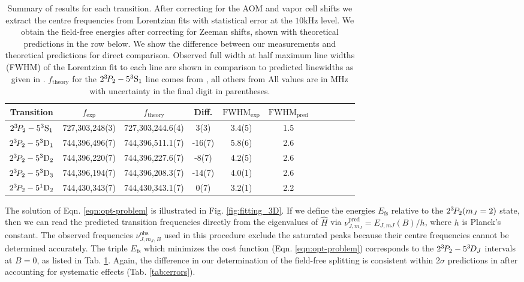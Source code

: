 \begin{table}
    \begin{tabular}{c c c c c c c c c c c}
      \hline\hline
      Transition                        &  $f_\textrm{exp}$ &  $f_\textrm{theory}$ & Diff.
		  &  $\textrm{FWHM}_{\textrm{exp}}$  &  $\textrm{FWHM}_{{\textrm{pred}}}$ \\
      \hline
        $2^{3\!} P_2 - 5^3\mathrm{S}_1$ &  {727,303,248(3)} &   727,303,244.6(4)   &  {3(3)}      &  3.4(5)  &  1.5\\ %
        $2^{3\!} P_2 - 5^3\mathrm{D}_1$ &  {744,396,496(7)} &   744,396,511.1(7)   &  {-16(7)}     &  5.8(6)  &  2.6\\
        $2^{3\!} P_2 - 5^3\mathrm{D}_2$ &  {744,396,220(7)} &   744,396,227.6(7)   &  {-8(7)}      &  4.2(5)  &  2.6\\
        $2^{3\!} P_2 - 5^3\mathrm{D}_3$ &  {744,396,194(7)} &   744,396,208.3(7)   &  {-14(7)}     &  4.0(1)  &  2.6\\
        $2^{3\!} P_2 - 5^1\mathrm{D}_2$ &  {744,430,343(7)} &   744,430,343.1(7)   &  {0(7)}      &  3.2(1)  &  2.2\\  %
      \hline\hline
    \end{tabular}
\caption{Summary of results for each transition.
	After correcting for the AOM and vapor cell shifts we extract the centre frequencies from Lorentzian fits with statistical error at the $10\textrm{kHz}$ level.
	We obtain the field-free energies after correcting for Zeeman shifts, shown with theoretical predictions in the row below.
	We show the difference between our measurements and theoretical predictions for direct comparison.
	Observed full width at half maximum line widths (FWHM) of the Lorentzian fit to each line are shown in comparison to predicted linewidths as given in \cite{Drake07}.
	$f_\textrm{theory}$ for the $2^{3\!} P_2 - 5^3\mathrm{S}_1$ line comes from \cite{Drake07}, all others from \cite{Yerokhin20}
	All values are in MHz with uncertainty in the final digit in parentheses.}
  \label{tab:results}
\end{table}
The solution of Eqn.
	\ref{eqn:opt-problem} is illustrated in Fig.
	\ref{fig:fitting_3D}.
	If we define the energies $E_{\textrm{fs}}$ relative to the $2^{3\!} P_2(m_J=2)$ state, then we can read the predicted transition frequencies directly from the eigenvalues of $\hat{H}$ via $\nu_{J,m_J}^{\textrm{pred}}=E_{J,mJ}(B)/h$, where $h$ is Planck's constant.
	The observed frequencies $\nu_{J,m_J,B}^{\textrm{obs}}$ used in this procedure exclude the saturated peaks because their centre frequencies cannot be determined accurately.
	The triple $E_{\textrm{fs}}$ which minimizes the cost function (Eqn.
	\ref{eqn:opt-problem}) corresponds to the $2^{3\!} P_2 - 5^{3\!} D_J$ intervals at $B=0$, as listed in Tab.
	\ref{tab:results}.
	Again, the difference in our determination of the field-free splitting is consistent within 2$\sigma$ predictions in \cite{Drake07} after accounting for systematic effects (Tab.
	\ref{tab:errors}).
	


